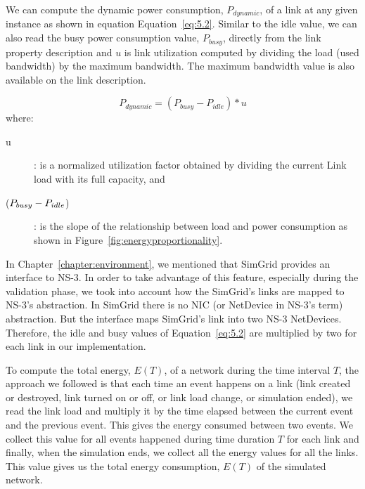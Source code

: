 We can compute the dynamic power consumption, \(P_{dynamic}\), of a link at any given instance as shown in equation Equation~\ref{eq:5.2}. Similar to the idle value, we can also read the busy power consumption value, \(P_{busy}\), directly from the 
link property description and $u$ is link utilization computed by dividing the load (used bandwidth) by the maximum bandwidth. The maximum bandwidth value is also available on the link description. 

\begin{equation} \label{eq:5.2}
P_{dynamic} = (P_{busy} - P_{idle}) * u 
\end{equation} 
where:
\begin{description}
    \item [u]: is a normalized utilization factor obtained by dividing the current Link load with its full capacity, and 
    \item [(\($$P_{busy} - P_{idle}$$\))]: is the slope of the relationship between load and power consumption as shown in Figure~\ref{fig:energyproportionality}.
\end{description} 

In Chapter~\ref{chapter:environment}, we mentioned that SimGrid provides an interface to NS-3. In order to take advantage of this feature, especially during the validation phase, we took into account how the SimGrid's links are mapped to NS-3's abstraction. In SimGrid there is no NIC (or NetDevice in NS-3's term) abstraction. But the interface maps SimGrid's link into two NS-3 NetDevices. Therefore, the idle and busy values of Equation~\ref{eq:5.2} are multiplied by two  for each link in our implementation.

To compute the total energy, \(E(T)\), of a network during the time interval $T$, the approach we followed is that each time an event happens on a link (link created or destroyed, link turned on or off, or link load change, or simulation ended), we read the link load and multiply it by the time elapsed between the current event and the previous event. This gives the energy consumed between two events. We collect this value for all events happened during time duration $T$ for each link and finally, when the simulation ends, we collect all the energy values for all the links. This value gives us the total energy consumption, \(E(T)\) of the simulated network.
